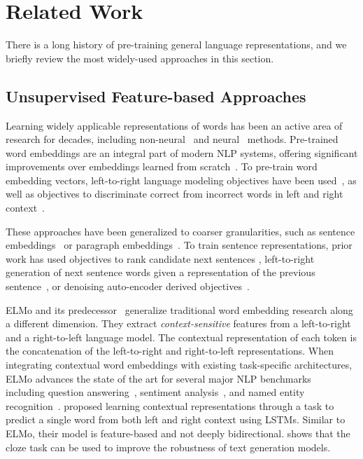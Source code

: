\section{Related Work} There is a long history of pre-training general language representations, and we briefly review the most widely-used approaches in this section.

\subsection{Unsupervised Feature-based Approaches} Learning widely applicable representations of words has been an active area of research for decades, including non-neural~\cite{brown-etal:1992:_class, ando-zhang:2005, blitzer-mcdonald-pereira:2006:_domain} and neural~\cite{mikolov-etal:2013, pennington-socher-manning:2014:_glove} methods. Pre-trained word embeddings are an integral part of modern NLP systems, offering significant improvements over embeddings learned from scratch~\cite{turian-ratinov-bengio:2010:_word_repres}. To pre-train word embedding vectors, left-to-right language modeling objectives have been used~\cite{minh09}, as well as objectives to  discriminate correct from incorrect words in left and right context~\cite{mikolov-etal:2013}.

These approaches have been generalized to coarser granularities, such as sentence embeddings~\cite{kiros-etal:2015:_skip, logeswaran2018an} or paragraph embeddings~\cite{le-mikolov:2014:_distr}. To train sentence representations, prior work has used objectives to rank candidate next sentences  \cite{DBLP:journals/corr/JerniteBS17, logeswaran2018an},  left-to-right generation of next sentence words given a representation of the previous sentence~\cite{kiros-etal:2015:_skip}, or denoising auto-encoder derived objectives~\cite{hill16}.

ELMo and its predecessor~\cite{peters-etal:2017:_semi, peters-etal:2018:_deep} generalize traditional word embedding research along a different dimension. They extract \emph{context-sensitive} features from a left-to-right and a right-to-left language model. The contextual representation of each token is the concatenation of the left-to-right and right-to-left representations. When integrating contextual word embeddings with existing task-specific architectures, ELMo advances the state of the art for several major NLP benchmarks~\cite{peters-etal:2018:_deep} including question answering~\cite{rajpurkar-etal:2016:_squad}, sentiment analysis~\cite{socher-etal:2013:_recur}, and named entity recognition~\cite{tjong-de:2003}.
\citet{melamud2016context2vec} proposed learning contextual representations through a task to predict a single word from both left and right context using LSTMs. Similar to ELMo, their model is feature-based and not deeply bidirectional. 
\citet{fedus2018maskgan} shows that the cloze task can be used to improve the robustness of text generation models. 

